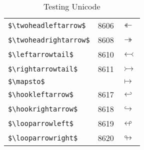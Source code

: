 \documentclass{article}
\begin{document}
\begin{table}
\begin{center}
\begin{tabular}{lll}
\verb#$\twoheadleftarrow$# & 8606 & $\twoheadleftarrow$\\ 
\verb#$\twoheadrightarrow$# & 8608 & $\twoheadrightarrow$\\ 
\verb#$\leftarrowtail$# & 8610 & $\leftarrowtail$\\ 
\verb#$\rightarrowtail$# & 8611 & $\rightarrowtail$\\ 
\verb#$\mapsto$# &  & $\mapsto$\\ 
\verb#$\hookleftarrow$# & 8617 & $\hookleftarrow$\\ 
\verb#$\hookrightarrow$# & 8618 & $\hookrightarrow$\\ 
\verb#$\looparrowleft$# & 8619 & $\looparrowleft$\\ 
\verb#$\looparrowright$# & 8620 & $\looparrowright$\\ 
\end{tabular}
\end{center}
\caption{Testing Unicode}
\end{table}
\clearpage
\end{document}
